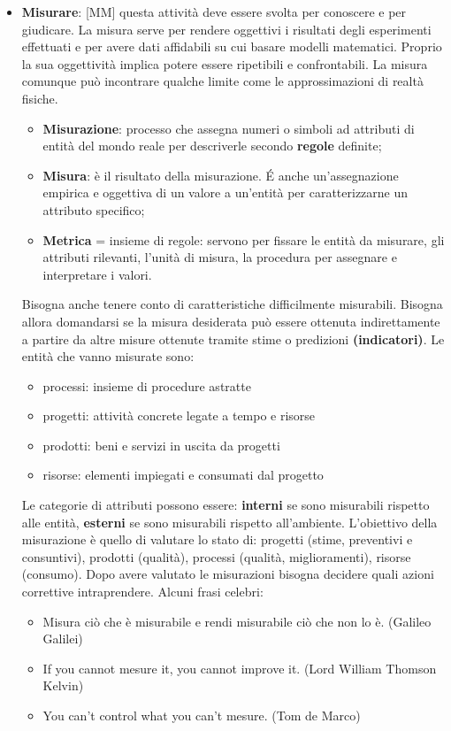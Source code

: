 \begin{itemize}
	\item \textbf{Misurare}: [MM] questa attività deve essere svolta per conoscere e per giudicare. La misura serve per rendere oggettivi i risultati degli esperimenti effettuati e per avere dati affidabili su cui basare modelli matematici. Proprio la sua oggettività implica potere essere ripetibili e confrontabili. La misura comunque può incontrare qualche limite come le approssimazioni di realtà fisiche.
		\begin{itemize}
			\item \textbf{Misurazione}: processo che assegna numeri o simboli ad attributi di entità del mondo reale per descriverle secondo \textbf{regole} definite;
			\item \textbf{Misura}: è il risultato della misurazione. \'E anche un'assegnazione empirica e oggettiva di un valore a un'entità per caratterizzarne un attributo specifico;
			\item \textbf{Metrica} = insieme di regole: servono per fissare le entità da misurare, gli attributi rilevanti, l'unità di misura, la procedura per assegnare e interpretare i valori.
		\end{itemize}
		\noindent
		Bisogna anche tenere conto di caratteristiche difficilmente misurabili. Bisogna allora domandarsi se la misura desiderata può essere ottenuta indirettamente a partire da altre misure ottenute tramite stime o predizioni \textbf{(indicatori)}. \newline
		Le entità che vanno misurate sono:
			\begin{itemize}
				\item processi: insieme di procedure astratte
				\item progetti: attività concrete legate a tempo e risorse
				\item prodotti: beni e servizi in uscita da progetti
				\item risorse: elementi impiegati e consumati dal progetto
			\end{itemize}
			\noindent
		Le categorie di attributi possono essere: \textbf{interni} se sono misurabili rispetto alle entità, \textbf{esterni} se sono misurabili rispetto all'ambiente. L'obiettivo della misurazione è quello di valutare lo stato di: progetti (stime, preventivi e consuntivi), prodotti (qualità), processi (qualità, miglioramenti), risorse (consumo).
		Dopo avere valutato le misurazioni bisogna decidere quali azioni correttive intraprendere. \newline
		Alcuni frasi celebri:
			\begin{itemize}
				\item Misura ciò che è misurabile e rendi misurabile ciò che non lo è. (Galileo Galilei)
				\item If you cannot mesure it, you cannot improve it. (Lord William Thomson Kelvin)
				\item You can't control what you can't mesure. (Tom de Marco)
			\end{itemize}



\end{itemize}
